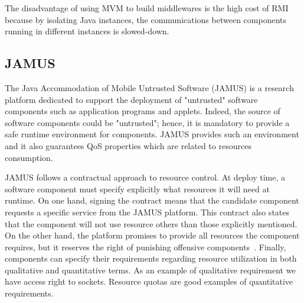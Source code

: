 The disadvantage of using MVM to build middlewares is the high cost of RMI because by isolating Java instances, the communications between components running in different instances is slowed-down.



\subsection{JAMUS} \label{JAMUS}

The Java Accommodation of Mobile Untrusted Software (JAMUS) is a research platform dedicated to support the deployment of "untrusted" software components such as application programs and applets.
Indeed, the source of software components could be "untrusted"; hence, it is mandatory to provide a safe runtime environment for components.
JAMUS provides such an environment and it also guarantees QoS properties which are related to resources consumption. 


JAMUS follows a contractual approach to resource control.
At deploy time, a software component must specify explicitly what resources it will need at runtime.
On one hand, signing the contract means that the candidate component requests a specific service from the JAMUS platform.
This contract also states that the component will not use resource others than those explicitly mentioned.
On the other hand, the platform promises to provide all resources the component requires, but it reserves the right of punishing offensive components~\cite{JAMUS2002}.
Finally, components can specify their requirements regarding resource utilization in both qualitative and quantitative terms.
As an example of qualitative requirement we have access right to sockets.
Resource quotas are good examples of quantitative requirements.

